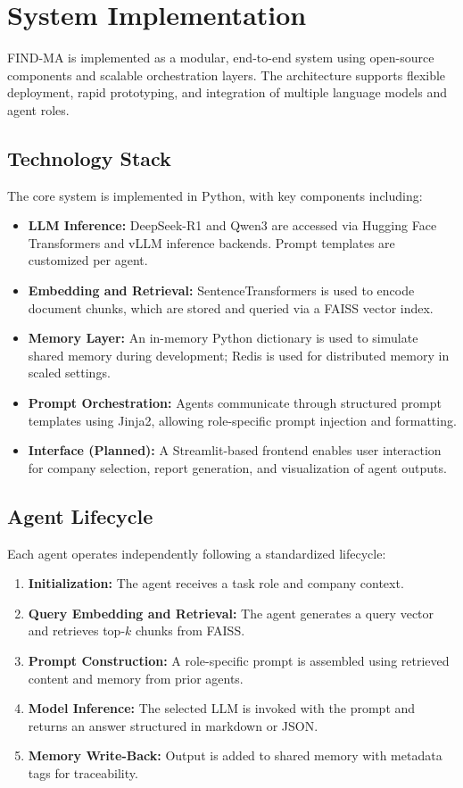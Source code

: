 \documentclass[11pt]{article}
\newcommand{\findma}{\textsc{FIND-MA}}
\begin{document}
\section{System Implementation}
\label{sec:implementation}
\findma{} is implemented as a modular, end-to-end system using open-source components and scalable orchestration layers. The architecture supports flexible deployment, rapid prototyping, and integration of multiple language models and agent roles.

\subsection*{Technology Stack}
The core system is implemented in Python, with key components including:
\begin{itemize}
    \item \textbf{LLM Inference:} DeepSeek-R1 and Qwen3 are accessed via Hugging Face Transformers and vLLM inference backends. Prompt templates are customized per agent.
    \item \textbf{Embedding and Retrieval:} SentenceTransformers is used to encode document chunks, which are stored and queried via a FAISS vector index.
    \item \textbf{Memory Layer:} An in-memory Python dictionary is used to simulate shared memory during development; Redis is used for distributed memory in scaled settings.
    \item \textbf{Prompt Orchestration:} Agents communicate through structured prompt templates using Jinja2, allowing role-specific prompt injection and formatting.
    \item \textbf{Interface (Planned):} A Streamlit-based frontend enables user interaction for company selection, report generation, and visualization of agent outputs.
\end{itemize}

\subsection*{Agent Lifecycle}
Each agent operates independently following a standardized lifecycle:
\begin{enumerate}
    \item \textbf{Initialization:} The agent receives a task role and company context.
    \item \textbf{Query Embedding and Retrieval:} The agent generates a query vector and retrieves top-$k$ chunks from FAISS.
    \item \textbf{Prompt Construction:} A role-specific prompt is assembled using retrieved content and memory from prior agents.
    \item \textbf{Model Inference:} The selected LLM is invoked with the prompt and returns an answer structured in markdown or JSON.
    \item \textbf{Memory Write-Back:} Output is added to shared memory with metadata tags for traceability.
\end{enumerate}
\end{document}
